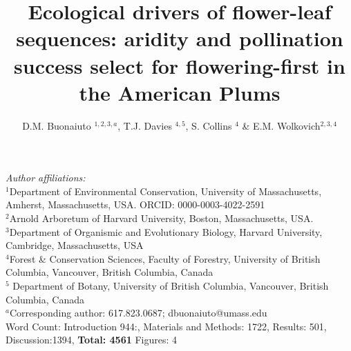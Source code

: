 \documentclass{article}[12pt]
\title{Ecological drivers of flower-leaf sequences: aridity and pollination success select for flowering-first in the American Plums}
\author{D.M. Buonaiuto $^{1,2,3,a}$, T.J. Davies $^{4,5}$, S. Collins $^{4}$ \& E.M. Wolkovich$^{2,3,4}$}
\date{}
\begin{document}

\maketitle
 \noindent \emph{Author affiliations:}\\
\noindent $^1$Department of Environmental Conservation, University of Massachusetts, Amherst, Massachusetts, USA. ORCID: 0000-0003-4022-2591\\
\noindent 
$^2$Arnold Arboretum of Harvard University, Boston, Massachusetts, USA.\\
$^3$Department of Organismic and Evolutionary Biology, Harvard University, Cambridge, Massachusetts, USA \\
$^4$Forest \& Conservation Sciences, Faculty of Forestry, University of British Columbia, Vancouver, British Columbia, Canada\\
$^5$ Department of Botany, University of British Columbia, Vancouver, British Columbia, Canada\\
$^a$Corresponding author: 617.823.0687; dbuonaiuto@umass.edu\\

Word Count: Introduction 944:, Materials and Methods: 1722, Results: 501, Discussion:1394, \textbf{Total: 4561}
Figures: 4\\

\pagebreak
\end{document}
